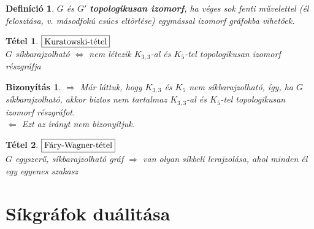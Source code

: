 \documentclass[a4paper,12pt,twoside]{book}
\newtheorem{defi}{Definíció}[chapter]
\newtheorem{tetel}{Tétel}[chapter]
\newtheorem{biz}{Bizonyítás}[chapter]
\theoremstyle{break}
\begin{document}
\begin{defi}
 $G$ és $G'$ \textbf{topologikusan izomorf}, ha véges sok fenti művelettel (él felosztása, v. másodfokú csúcs eltörlése) egymással izomorf gráfokba vihetőek.
\end{defi}

\begin{tetel}$\boxed{$Kuratowski-tétel$}$\\
 $G$ síkbarajzolható $\Leftrightarrow$ nem létezik $K_{3,3}$-al és $K_5$-tel topologikusan izomorf részgráfja
\end{tetel}
\begin{biz}
 $\Rightarrow$ Már láttuk, hogy $K_{3,3}$ és $K_5$ nem síkbarajzolható, így, ha $G$ síkbarajzolható, akkor biztos nem tartalmaz $K_{3,3}$-al és $K_5$-tel topologikusan izomorf részgráfot.\\
 $\Leftarrow$ Ezt az irányt nem bizonyítjuk.
\end{biz}

\begin{tetel}$\boxed{$Fáry-Wagner-tétel$}$\\
 $G$ egyszerű, síkbarajzolható gráf $\Rightarrow$ van olyan síkbeli lerajzolása, ahol minden él egy egyenes szakasz
\end{tetel}
\addtocounter{biz}{1}

\section{Síkgráfok duálitása}
\end{document}

